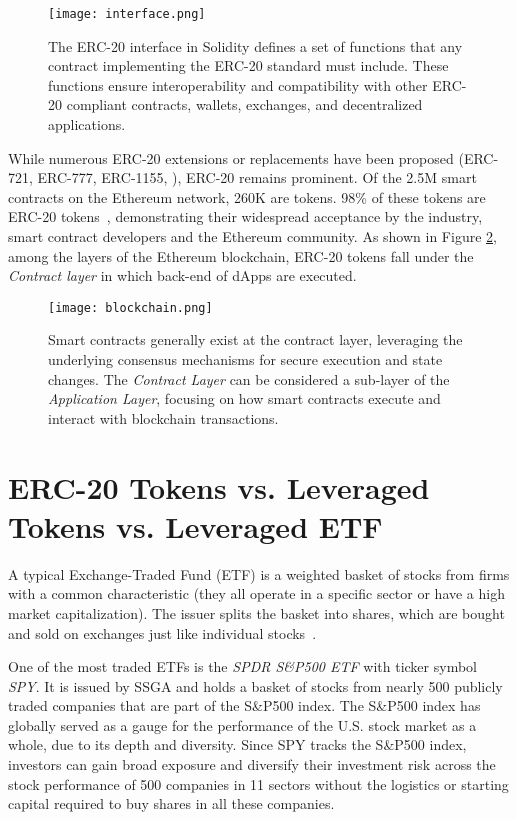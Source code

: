 \begin{figure}[t]
	\centering
	\texttt{[image: interface.png]}
	\caption[The ERC-20 interface in Solidity]{The ERC-20 interface in Solidity defines a set of functions that any contract implementing the ERC-20 standard must include. These functions ensure interoperability and compatibility with other ERC-20 compliant contracts, wallets, exchanges, and decentralized applications.}
	\label{fig:interface}
\end{figure}

While numerous ERC-20 extensions or replacements have been proposed (\eg ERC-721, ERC-777, ERC-1155, \etc), ERC-20 remains prominent. Of the 2.5M smart contracts on the Ethereum network, 260K are tokens. 98\% of these tokens are ERC-20 tokens~\cite{TokenTracker}, demonstrating their widespread acceptance by the industry, smart contract developers and the Ethereum community. As shown in Figure \ref{fig:layers}, among the layers of the Ethereum blockchain, ERC-20 tokens fall under the \textit{Contract layer} in which back-end of dApps are executed.

\begin{figure}[t]
	\centering
	\texttt{[image: blockchain.png]}
	\caption[Ethereum layers and Smart Contract execution]{Smart contracts generally exist at the contract layer, leveraging the underlying consensus mechanisms for secure execution and state changes. The \textit{Contract Layer} can be considered a sub-layer of the \textit{Application Layer}, focusing on how smart contracts execute and interact with blockchain transactions.}
	\label{fig:layers}
\end{figure}

\section{ERC-20 Tokens vs. Leveraged Tokens vs. Leveraged ETF}
A typical Exchange-Traded Fund (ETF) is a weighted basket of stocks from firms with a common characteristic (\eg they all operate in a specific sector or have a high market capitalization). The issuer splits the basket into shares, which are bought and sold on exchanges just like individual stocks~\cite{liebi2020effect}.
\begin{example}
	One of the most traded ETFs is the \textsl{SPDR S\&P500 ETF} with ticker symbol \textsl{SPY}. It is issued by SSGA and holds a basket of stocks from nearly 500 publicly traded companies that are part of the S\&P500 index. The S\&P500 index has globally served as a gauge for the performance of the U.S. stock market as a whole, due to its depth and diversity. Since SPY tracks the S\&P500 index, investors can gain broad exposure and diversify their investment risk across the stock performance of 500 companies in 11 sectors without the logistics or starting capital required to buy shares in all these companies.
\end{example}

